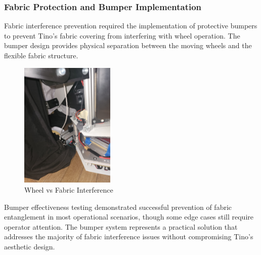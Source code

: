\subsubsection{Fabric Protection and Bumper Implementation}

Fabric interference prevention required the implementation of protective bumpers to prevent Tino's fabric covering from interfering with wheel operation. The bumper design provides physical separation between the moving wheels and the flexible fabric structure.

\begin{figure}[H]
    \centering
    \includegraphics[height=6cm,angle=-90]{Images/WheelVSFabric (2).jpg}
    \caption{Wheel vs Fabric Interference}
    \label{fig:wheel_vs_fabric}
\end{figure}

Bumper effectiveness testing demonstrated successful prevention of fabric entanglement in most operational scenarios, though some edge cases still require operator attention. The bumper system represents a practical solution that addresses the majority of fabric interference issues without compromising Tino's aesthetic design.

